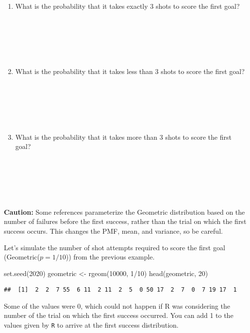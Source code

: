 \documentclass[
  11pt,
]{book}
\newenvironment{Shaded}{\begin{snugshade}}{\end{snugshade}}
\newcommand{\DecValTok}[1]{\textcolor[rgb]{0.00,0.00,0.81}{#1}}
\newcommand{\FunctionTok}[1]{\textcolor[rgb]{0.00,0.00,0.00}{#1}}
\newcommand{\NormalTok}[1]{#1}
\newcommand{\OtherTok}[1]{\textcolor[rgb]{0.56,0.35,0.01}{#1}}
\newcommand{\SpecialCharTok}[1]{\textcolor[rgb]{0.00,0.00,0.00}{#1}}
\theoremstyle{definition}
\theoremstyle{definition}
\theoremstyle{definition}
\theoremstyle{definition}
\theoremstyle{remark}
\begin{document}
\begin{enumerate}
\def\labelenumi{(\alph{enumi})}
\item
  What is the probability that it takes exactly 3 shots to score the first goal?\\
  \strut \\
  \strut \\
  \strut \\
\item
  What is the probability that it takes less than 3 shots to score the first goal?\\
  \strut \\
  \strut \\
  \strut \\
\item
  What is the probability that it takes more than 3 shots to score the first goal?\\
  \strut \\
  \strut \\
  \strut \\
\end{enumerate}

\textbf{Caution:} Some references parameterize the Geometric distribution based on the number of failures before the first success, rather than the trial on which the first success occurs. This changes the PMF, mean, and variance, so be careful.

Let's simulate the number of shot attempts required to score the first goal (Geometric(\(p=1/10\))) from the previous example.

\begin{Shaded}
\begin{Highlighting}[]
\FunctionTok{set.seed}\NormalTok{(}\DecValTok{2020}\NormalTok{)}
\NormalTok{geometric }\OtherTok{\textless{}{-}} \FunctionTok{rgeom}\NormalTok{(}\DecValTok{10000}\NormalTok{, }\DecValTok{1}\SpecialCharTok{/}\DecValTok{10}\NormalTok{)}
\FunctionTok{head}\NormalTok{(geometric, }\DecValTok{20}\NormalTok{)}
\end{Highlighting}
\end{Shaded}

\begin{verbatim}
##  [1]  2  2  7 55  6 11  2 11  2  5  0 50 17  2  7  0  7 19 17  1
\end{verbatim}

Some of the values were 0, which could not happen if R was considering the number of the trial on which the first success occurred. You can add 1 to the values given by \texttt{R} to arrive at the first success distribution.
\end{document}

